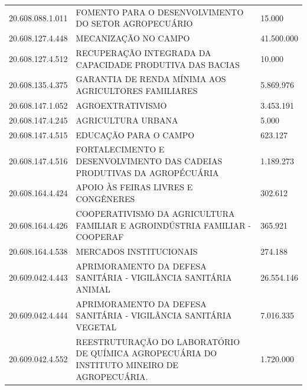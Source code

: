 \documentclass{article}
\begin{document}
\begin{longtable}[c]{m{3cm}|m{12cm}|m{2cm}}
\multicolumn{1}{C{3cm}|}{20.608.088.1.011} & \multicolumn{1}{L{12cm}|}{FOMENTO PARA O DESENVOLVIMENTO DO SETOR AGROPECUÁRIO} & \multicolumn{1}{R{2cm}}{15.000} \\
\multicolumn{1}{C{3cm}|}{20.608.127.4.448} & \multicolumn{1}{L{12cm}|}{MECANIZAÇÃO NO CAMPO} & \multicolumn{1}{R{2cm}}{41.500.000} \\
\multicolumn{1}{C{3cm}|}{20.608.127.4.512} & \multicolumn{1}{L{12cm}|}{RECUPERAÇÃO INTEGRADA DA CAPACIDADE PRODUTIVA DAS BACIAS} & \multicolumn{1}{R{2cm}}{10.000} \\
\multicolumn{1}{C{3cm}|}{20.608.135.4.375} & \multicolumn{1}{L{12cm}|}{GARANTIA DE RENDA MÍNIMA AOS AGRICULTORES FAMILIARES} & \multicolumn{1}{R{2cm}}{5.869.976} \\
\multicolumn{1}{C{3cm}|}{20.608.147.1.052} & \multicolumn{1}{L{12cm}|}{AGROEXTRATIVISMO} & \multicolumn{1}{R{2cm}}{3.453.191} \\
\multicolumn{1}{C{3cm}|}{20.608.147.4.245} & \multicolumn{1}{L{12cm}|}{AGRICULTURA URBANA} & \multicolumn{1}{R{2cm}}{5.000} \\
\multicolumn{1}{C{3cm}|}{20.608.147.4.515} & \multicolumn{1}{L{12cm}|}{EDUCAÇÃO PARA O CAMPO} & \multicolumn{1}{R{2cm}}{623.127} \\
\multicolumn{1}{C{3cm}|}{20.608.147.4.516} & \multicolumn{1}{L{12cm}|}{FORTALECIMENTO E DESENVOLVIMENTO DAS CADEIAS PRODUTIVAS DA AGROPÉCUÁRIA} & \multicolumn{1}{R{2cm}}{1.189.273} \\
\multicolumn{1}{C{3cm}|}{20.608.164.4.424} & \multicolumn{1}{L{12cm}|}{APOIO ÀS FEIRAS LIVRES E CONGÊNERES} & \multicolumn{1}{R{2cm}}{302.612} \\
\multicolumn{1}{C{3cm}|}{20.608.164.4.426} & \multicolumn{1}{L{12cm}|}{COOPERATIVISMO DA AGRICULTURA FAMILIAR E AGROINDÚSTRIA FAMILIAR - COOPERAF} & \multicolumn{1}{R{2cm}}{365.921} \\
\multicolumn{1}{C{3cm}|}{20.608.164.4.538} & \multicolumn{1}{L{12cm}|}{MERCADOS INSTITUCIONAIS} & \multicolumn{1}{R{2cm}}{274.188} \\
\multicolumn{1}{C{3cm}|}{20.609.042.4.443} & \multicolumn{1}{L{12cm}|}{APRIMORAMENTO DA DEFESA SANITÁRIA - VIGILÂNCIA SANITÁRIA ANIMAL} & \multicolumn{1}{R{2cm}}{26.554.146} \\
\multicolumn{1}{C{3cm}|}{20.609.042.4.444} & \multicolumn{1}{L{12cm}|}{APRIMORAMENTO DA DEFESA SANITÁRIA - VIGILÂNCIA SANITÁRIA VEGETAL} & \multicolumn{1}{R{2cm}}{7.016.335} \\
\multicolumn{1}{C{3cm}|}{20.609.042.4.552} & \multicolumn{1}{L{12cm}|}{REESTRUTURAÇÃO DO LABORATÓRIO DE QUÍMICA AGROPECUÁRIA DO INSTITUTO MINEIRO DE AGROPECUÁRIA.} & \multicolumn{1}{R{2cm}}{1.720.000} \\

\end{longtable}
\end{document}
